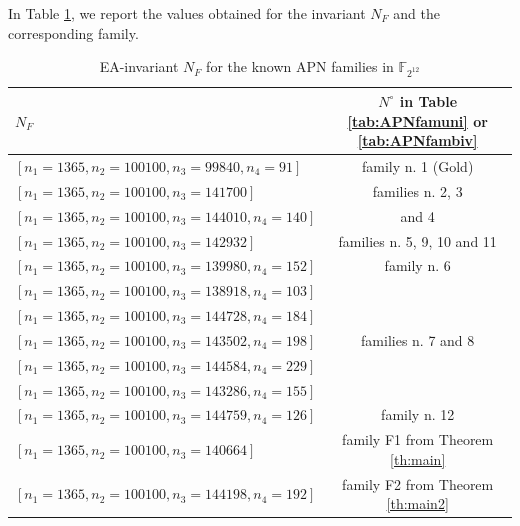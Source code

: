 \documentclass{article}
\begin{document}
In Table \ref{tab1}, we report the values obtained for the invariant $N_F$ and the corresponding family.
\begin{table}[h!]
    \centering

    \begin{tabular}{|l|c|}
   \hline
     { \centering $ {N_F}$ }  & { $N^\circ$ in Table \ref{tab:APNfamuni} or \ref{tab:APNfambiv} }\\
      \hline
      \hline
             $[n_1=1365,n_2=100100,n_3= 99840,n_4=  91] $ & family n. 1 (Gold)\\
             \hline
       $[n_1=1365, n_2=100100,n_3=141700]$  & families n. 2, 3  \\
       $ [n_1=1365,n_2=100100,n_3=144010,n_4= 140]$ & and 4 \\
       \hline
       $[n_1=1365, n_2=100100,n_3= 142932 ] $ & families n. 5, 9, 10 and 11\\
       \hline
       $ [n_1=1365, n_2=100100,n_3= 139980,n_4=  152 ]$ & family n. 6 \\
       $ [n_1=1365,n_2= 100100,n_3= 138918,n_4=  103 ]$ & \\
       \hline
       $[n_1=1365,n_2= 100100, n_3=144728,n_4=  184 ] $ &  \\
       $[n_1=1365,n_2= 100100,n_3= 143502,n_4=  198 ] $ & families n. 7 and 8\\
       $[n_1=1365,n_2= 100100,n_3= 144584,n_4=  229 ] $ & \\
       $[n_1=1365,n_2= 100100,n_3= 143286,n_4=  155 ] $ & \\
       \hline
       $ [n_1=1365,n_2= 100100,n_3= 144759,n_4= 126 ]$ & family n. 12\\
       \hline
    $ [n_1=1365,n_2=100100,n_3=140664]$ & family F1 from Theorem \ref{th:main}\\
    \hline
    $ [n_1=1365,n_2=100100,n_3=144198,n_ 4=192]$ &family F2 from Theorem \ref{th:main2}\\
    \hline
    \end{tabular}
    \caption{EA-invariant $N_F$ for the known APN families in $\mathbb{F}_{2^{12}}$}
    \label{tab1}
\end{table}
\end{document}
